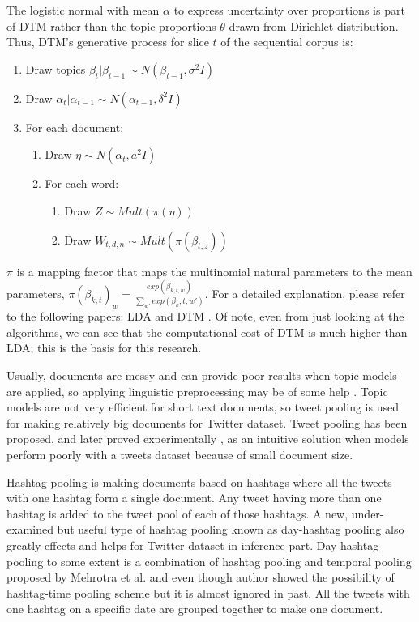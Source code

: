 The logistic normal with mean $ \alpha $ to express uncertainty over proportions is part of DTM rather than the topic proportions $\theta$ drawn from Dirichlet distribution. Thus, DTM's generative process for slice $t$ of the sequential corpus is:

\begin{enumerate}
\item Draw topics $ \beta_t | \beta_{t-1}  \sim N(\beta_{t-1}, \sigma^2I) $
\item Draw $ \alpha_t | \alpha_{t-1}  \sim N(\alpha_{t-1}, \delta^2I) $
\item For each document:
\begin{enumerate}
\item Draw $ \eta \sim N(\alpha_t, a^2I)$
\item For each word:
\begin{enumerate}
\item Draw $Z \sim Mult(\pi(\eta)) $
\item Draw $W_{t,d,n} \sim Mult(\pi(\beta_{t,z})) $
\end{enumerate}
\end{enumerate}
\end{enumerate}

$\pi$ is a mapping factor that maps the multinomial natural parameters to the mean parameters, $\pi(\beta_{k, t})_w = \frac{exp(\beta_{k,t,w})}{\sum_{w'} exp(\beta_k,t,w')}$. For a detailed explanation, please refer to the following papers: LDA \cite{blei2003latent} and DTM \cite{blei2006dynamic}. Of note, even from just looking at the algorithms, we can see that the computational cost of DTM is much higher than LDA; this is the basis for this research.

Usually, documents are messy and can provide poor results when topic models are applied, so applying linguistic preprocessing may be of some help \cite{han2012automatically}. Topic models are not very efficient for short text documents, so tweet pooling is used for making relatively big documents for Twitter dataset. Tweet pooling has been proposed, and later proved experimentally \cite{mehrotra2013improving}, as an intuitive solution \cite{hong2010empirical,zhao2011comparing} when models perform poorly with a tweets dataset because of small document size.

Hashtag pooling is making documents based on hashtags where all the tweets with one hashtag form a single document. Any tweet having more than one hashtag is added to the tweet pool of each of those hashtags.  A new, under-examined but useful type of hashtag pooling known as day-hashtag pooling also greatly effects and helps for Twitter dataset in inference part. Day-hashtag pooling to some extent is a combination of hashtag pooling and temporal pooling proposed by Mehrotra et al. \cite{mehrotra2013improving} and even though author showed the possibility of hashtag-time pooling scheme but it is almost ignored in past. All the tweets with one hashtag on a specific date are grouped together to make one document.